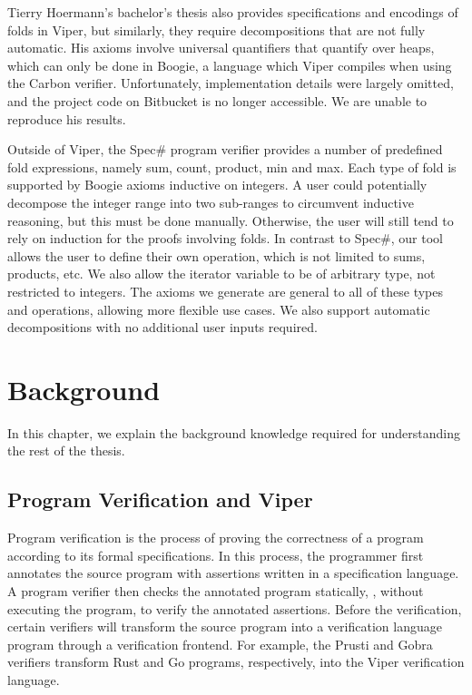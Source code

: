 \documentclass[msc,oneside]{ubcthesis}
\theoremstyle{definition}
\begin{document}
Tierry Hoermann’s bachelor’s thesis also provides specifications and encodings of folds in Viper, but similarly, they require decompositions that are not fully automatic. His axioms involve universal quantifiers that quantify over heaps, which can only be done in Boogie, a language which Viper compiles when using the Carbon verifier. 
Unfortunately, implementation details were largely omitted, and the project code on Bitbucket is no longer accessible. We are unable to reproduce his results.
	
Outside of Viper, the Spec\# program verifier provides a number of predefined fold expressions, namely sum, count, product, min and max. Each type of fold is supported by Boogie axioms inductive on integers. 
A user could potentially decompose the integer range into two sub-ranges to circumvent inductive reasoning, but this must be done manually. 
Otherwise, the user will still tend to rely on induction for the proofs involving folds. In contrast to Spec\#, our tool allows the user to define their own operation, which is not limited to sums, products, etc. We also allow the iterator variable to be of arbitrary type, not restricted to integers. The axioms we generate are general to all of these types and operations, allowing more flexible use cases. We also support automatic decompositions with no additional user inputs required.

\newpage

\chapter{Background}
In this chapter, we explain the background knowledge required for understanding the rest of the thesis.


\section{Program Verification and Viper}
Program verification is the process of proving the correctness of a program according to its formal specifications. In this process, the programmer first annotates the source program with assertions written in a specification language. A program verifier then checks the annotated program statically, \ie, without executing the program, to verify the annotated assertions. Before the verification, certain verifiers will transform the source program into a verification language program through a verification frontend. For example, the Prusti \cite{prusti} and Gobra \cite{gobra} verifiers transform Rust and Go programs, respectively, into the Viper verification language.
\end{document}
